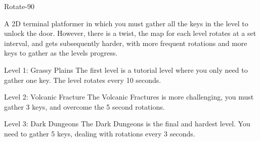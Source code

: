Rotate-\/90

A 2D terminal platformer in which you must gather all the keys in the level to unlock the door. However, there is a twist, the map for each level rotates at a set interval, and gets subsequently harder, with more frequent rotations and more keys to gather as the levels progress.

Level 1\+: Grassy Plains The first level is a tutorial level where you only need to gather one key. The level rotates every 10 seconds.

Level 2\+: Volcanic Fracture The Volcanic Fractures is more challenging, you must gather 3 keys, and overcome the 5 second rotations.

Level 3\+: Dark Dungeons The Dark Dungeons is the final and hardest level. You need to gather 5 keys, dealing with rotations every 3 seconds. 